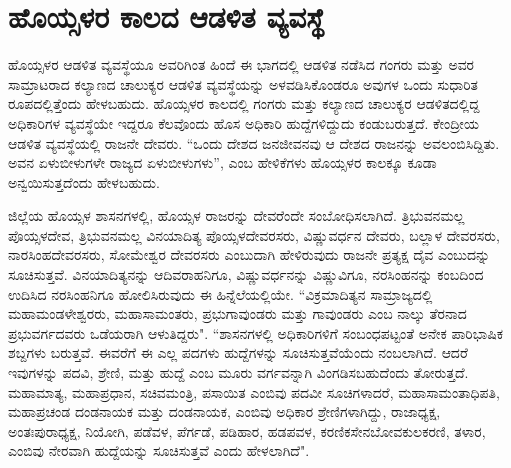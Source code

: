 \section{ಹೊಯ್ಸಳರ ಕಾಲದ ಆಡಳಿತ ವ್ಯವಸ್ಥೆ}

ಹೊಯ್ಸಳರ ಆಡಳಿತ ವ್ಯವಸ್ಥೆಯೂ ಅವರಿಗಿಂತ ಹಿಂದೆ ಈ ಭಾಗದಲ್ಲಿ ಆಡಳಿತ ನಡೆಸಿದ ಗಂಗರು ಮತ್ತು ಅವರ ಸಾಮ್ರಾಟರಾದ ಕಲ್ಯಾಣದ ಚಾಲುಕ್ಯರ ಆಡಳಿತ ವ್ಯವಸ್ಥೆಯನ್ನು ಅಳವಡಿಸಿಕೊಂಡರೂ ಅವುಗಳ ಒಂದು ಸುಧಾರಿತ ರೂಪದಲ್ಲಿತ್ತೆಂದು ಹೇಳಬಹುದು. ಹೊಯ್ಸಳರ ಕಾಲದಲ್ಲಿ ಗಂಗರು ಮತ್ತು ಕಲ್ಯಾಣದ ಚಾಲುಕ್ಯರ ಆಡಳಿತದಲ್ಲಿದ್ದ ಅಧಿಕಾರಿಗಳ ವ್ಯವಸ್ಥೆಯೇ ಇದ್ದರೂ ಕೆಲವೊಂದು ಹೊಸ ಅಧಿಕಾರಿ ಹುದ್ದೆಗಳಿದ್ದುದು ಕಂಡುಬರುತ್ತದೆ. ಕೇಂದ್ರೀಯ ಆಡಳಿತ ವ್ಯವಸ್ಥೆಯಲ್ಲಿ ರಾಜನೇ ದೇವರು. “ಒಂದು ದೇಶದ ಜನಜೀವನವು ಆ ದೇಶದ ರಾಜನನ್ನು ಅವಲಂಬಿಸಿದ್ದಿತು. ಅವನ ಏಳುಬೀಳುಗಳೇ ರಾಜ್ಯದ ಏಳುಬೀಳುಗಳು”, ಎಂಬ ಹೇಳಿಕೆಗಳು ಹೊಯ್ಸಳರ ಕಾಲಕ್ಕೂ ಕೂಡಾ ಅನ್ವಯಿಸುತ್ತದೆಂದು ಹೇಳಬಹುದು.

ಜಿಲ್ಲೆಯ ಹೊಯ್ಸಳ ಶಾಸನಗಳಲ್ಲಿ, ಹೊಯ್ಸಳ ರಾಜರನ್ನು ದೇವರೆಂದೇ ಸಂಬೋಧಿಸಲಾಗಿದೆ. ತ್ರಿಭುವನಮಲ್ಲ ಪೊಯ್ಸಳದೇವ, ತ್ರಿಭುವನಮಲ್ಲ ವಿನಯಾದಿತ್ಯ ಪೊಯ್ಸಳದೇವರಸರು, ವಿಷ್ಣುವರ್ಧನ ದೇವರು, ಬಲ್ಲಾಳ ದೇವರಸರು, ನಾರಸಿಂಹದೇವರಸರು, ಸೋಮೇಶ್ವರ ದೇವರಸರು ಎಂಬುದಾಗಿ ಹೇಳಿರುವುದು ರಾಜನೇ ಪ್ರತ್ಯಕ್ಷ ದೈವ ಎಂಬುದನ್ನು ಸೂಚಿಸುತ್ತವೆ. ವಿನಯಾದಿತ್ಯನನ್ನು ಆದಿವರಾಹನಿಗೂ, ವಿಷ್ಣುವರ್ಧನನ್ನು ವಿಷ್ಣುವಿಗೂ, ನರಸಿಂಹನನ್ನು ಕಂಬದಿಂದ ಉದಿಸಿದ ನರಸಿಂಹನಿಗೂ ಹೋಲಿಸಿರುವುದು ಈ ಹಿನ್ನೆಲೆಯಲ್ಲಿಯೇ. “ವಿಕ್ರಮಾದಿತ್ಯನ ಸಾಮ್ರಾಜ್ಯದಲ್ಲಿ ಮಹಾಮಂಡಳೇಶ್ವರರು, ಮಹಾಸಾಮಂತರು, ಪ್ರಭುಗಾವುಂಡರು ಮತ್ತು ಗಾವುಂಡರು ಎಂಬ ನಾಲ್ಕು ತೆರನಾದ ಪ್ರಭುವರ್ಗದವರು ಒಡೆಯರಾಗಿ ಆಳುತಿದ್ದರು". “ಶಾಸನಗಳಲ್ಲಿ ಅಧಿಕಾರಿಗಳಿಗೆ ಸಂಬಂಧಪಟ್ಟಂತೆ ಅನೇಕ ಪಾರಿಭಾಷಿಕ ಶಬ್ದಗಳು ಬರುತ್ತವೆ. ಈವರೆಗೆ ಈ ಎಲ್ಲ ಪದಗಳು ಹುದ್ದೆಗಳನ್ನು ಸೂಚಿಸುತ್ತವೆಯೆಂದು ನಂಬಲಾಗಿದೆ. ಆದರೆ ಇವುಗಳನ್ನು ಪದವಿ, ಶ್ರೇಣಿ, ಮತ್ತು ಹುದ್ದೆ ಎಂಬ ಮೂರು ವರ್ಗವನ್ನಾಗಿ ವಿಂಗಡಿಸಬಹುದೆಂದು ತೋರುತ್ತದೆ. ಮಹಾಮಾತ್ಯ, ಮಹಾಪ್ರಧಾನ, ಸಚಿವ\enginline{-}ಮಂತ್ರಿ, ಪಸಾಯಿತ ಎಂಬಿವು ಪದವೀ ಸೂಚಿಗಳಾದರೆ, ಮಹಾಸಾಮಂತಾಧಿಪತಿ, ಮಹಾಪ್ರಚಂಡ ದಂಡನಾಯಕ ಮತ್ತು ದಂಡನಾಯಕ, ಎಂಬಿವು ಅಧಿಕಾರ ಶ್ರೇಣಿಗಳಾಗಿದ್ದು, ರಾಜಾಧ್ಯಕ್ಷ, ಅಂತಃಪುರಾಧ್ಯಕ್ಷ, ನಿಯೋಗಿ, ಪಡೆವಳ, ಪೆರ್ಗಡೆ, ಪಡಿಹಾರ, ಹಡಪವಳ, ಕರಣಿಕ\enginline{-}ಸೇನಬೋವ\enginline{-}ಕುಲಕರಣಿ, ತಳಾರ, ಎಂಬಿವು ನೇರವಾಗಿ ಹುದ್ದೆಯನ್ನು ಸೂಚಿಸುತ್ತವೆ ಎಂದು ಹೇಳಲಾಗಿದೆ".

